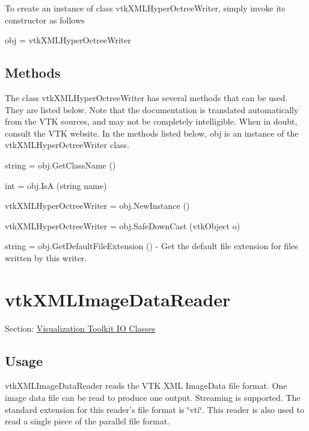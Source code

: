 To create an instance of class vtk\-X\-M\-L\-Hyper\-Octree\-Writer, simply invoke its constructor as follows \begin{DoxyVerb}  obj = vtkXMLHyperOctreeWriter
\end{DoxyVerb}
 \hypertarget{vtkwidgets_vtkxyplotwidget_Methods}{}\subsection{Methods}\label{vtkwidgets_vtkxyplotwidget_Methods}
The class vtk\-X\-M\-L\-Hyper\-Octree\-Writer has several methods that can be used. They are listed below. Note that the documentation is translated automatically from the V\-T\-K sources, and may not be completely intelligible. When in doubt, consult the V\-T\-K website. In the methods listed below, {\ttfamily obj} is an instance of the vtk\-X\-M\-L\-Hyper\-Octree\-Writer class. 
\begin{DoxyItemize}
\item {\ttfamily string = obj.\-Get\-Class\-Name ()}  
\item {\ttfamily int = obj.\-Is\-A (string name)}  
\item {\ttfamily vtk\-X\-M\-L\-Hyper\-Octree\-Writer = obj.\-New\-Instance ()}  
\item {\ttfamily vtk\-X\-M\-L\-Hyper\-Octree\-Writer = obj.\-Safe\-Down\-Cast (vtk\-Object o)}  
\item {\ttfamily string = obj.\-Get\-Default\-File\-Extension ()} -\/ Get the default file extension for files written by this writer.  
\end{DoxyItemize}\hypertarget{vtkio_vtkxmlimagedatareader}{}\section{vtk\-X\-M\-L\-Image\-Data\-Reader}\label{vtkio_vtkxmlimagedatareader}
Section\-: \hyperlink{sec_vtkio}{Visualization Toolkit I\-O Classes} \hypertarget{vtkwidgets_vtkxyplotwidget_Usage}{}\subsection{Usage}\label{vtkwidgets_vtkxyplotwidget_Usage}
vtk\-X\-M\-L\-Image\-Data\-Reader reads the V\-T\-K X\-M\-L Image\-Data file format. One image data file can be read to produce one output. Streaming is supported. The standard extension for this reader's file format is \char`\"{}vti\char`\"{}. This reader is also used to read a single piece of the parallel file format.

